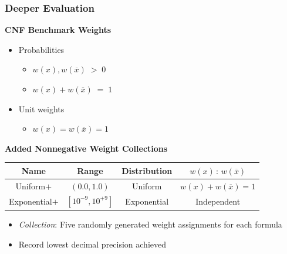 \documentclass[t,pdf]{beamer}
\newcommand{\obar}[1]{\overline{#1}}
\newcommand{\bitem}{\item[$\bullet$]}
\begin{document}
\begin{frame}
  \frametitle{Deeper Evaluation}

  \textbf{CNF Benchmark Weights}
  \begin{itemize}
  \item Probabilities
    \begin{itemize}
      \bitem $w(x), w(\obar{x}) \;>\; 0$
      \bitem $w(x) + w(\obar{x})\; = \;1$
    \end{itemize}
  \item Unit weights
    \begin{itemize}
      \bitem $w(x) = w(\obar{x}) = 1$
    \end{itemize}
  \end{itemize}

\medskip

  \textbf{Added Nonnegative Weight Collections}

 \begin{center}
   \begin{tabular}{cccc}
     Name & Range & Distribution & $w(x)\,:\,w(\obar{x})$ \\
     \midrule
     Uniform$+$      & $(0.0, 1.0)$         & Uniform     & $w(x) + w(\obar{x}) = 1$ \\[0.5em]
     Exponential$+$ & $[10^{-9}, 10^{+9}]$ & Exponential & Independent \\
   \end{tabular}
 \end{center}

  \begin{itemize}
    \item \emph{Collection}: Five randomly generated weight assignments for each formula
    \item Record lowest decimal precision achieved
  \end{itemize}

\end{frame}
\end{document}
